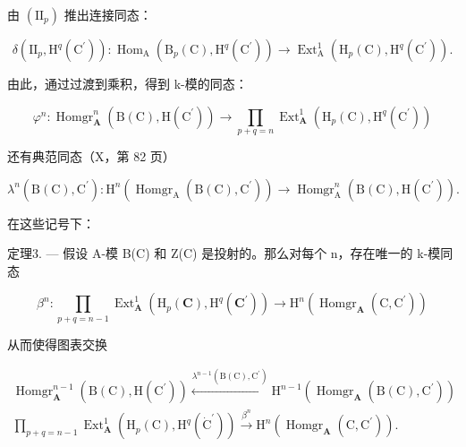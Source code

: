 由 \((\mathrm{II}_{p})\) 推出连接同态：

\[
\delta \left(\mathrm{II} _ {p}, \mathrm{H} ^ {q} \left(\mathrm{C} ^ {\prime}\right)\right): \operatorname{Hom} _ {\mathrm{A}} \left(\mathrm{B} _ {p} (\mathrm{C}), \mathrm{H} ^ {q} \left(\mathrm{C} ^ {\prime}\right)\right)\rightarrow \operatorname{Ext} _ {\mathrm{A}} ^ {1} \left(\mathrm{H} _ {p} (\mathrm{C}), \mathrm{H} ^ {q} \left(\mathrm{C} ^ {\prime}\right)\right).
\]

由此，通过过渡到乘积，得到 k-模的同态：

\[
\varphi^ {n}: \operatorname{Homgr} _ {\mathbf {A}} ^ {n} (\mathrm{B} (\mathrm{C}), \mathrm{H} (\mathrm{C} ^ {\prime})) \rightarrow \prod_ {p + q = n} \operatorname{Ext} _ {\mathbf {A}} ^ {1} \left(\mathrm{H} _ {p} (\mathrm{C}), \mathrm{H} ^ {q} (\mathrm{C} ^ {\prime})\right)
\]

还有典范同态（X，第 82 页）

\[
\lambda^ {n} (\mathrm{B} (\mathrm{C}), \mathrm{C} ^ {\prime}): \mathrm{H} ^ {n} \left(\operatorname{Homgr} _ {\mathrm{A}} (\mathrm{B} (\mathrm{C}), \mathrm{C} ^ {\prime})\right)\rightarrow \operatorname{Homgr} _ {\mathrm{A}} ^ {n} (\mathrm{B} (\mathrm{C}), \mathrm{H} (\mathrm{C} ^ {\prime})) .
\]

在这些记号下：

定理3. --- 假设 A-模 B(C) 和 Z(C) 是投射的。那么对每个 n，存在唯一的 k-模同态

\[
\beta^ {n}: \prod_ {p + q = n - 1} \operatorname{Ext} _ {\mathbf {A}} ^ {1} \left(\mathrm{H} _ {p} (\mathbf {C}), \mathrm{H} ^ {q} \left(\mathbf {C} ^ {\prime}\right)\right)\rightarrow \mathrm{H} ^ {n} \left(\operatorname{Homgr} _ {\mathbf {A}} \left(\mathrm{C}, \mathrm{C} ^ {\prime}\right)\right)
\]

从而使得图表交换

\[
\begin{array}{c} \operatorname{Homgr} _ {\mathbf {A}} ^ {n - 1} (\mathrm{B} (\mathrm{C}), \mathrm{H} (\mathrm{C} ^ {\prime})) \xleftarrow {\lambda^ {n - 1} (\mathrm{B} (\mathrm{C}) , \mathrm{C} ^ {\prime})} \mathrm{H} ^ {n - 1} (\operatorname{Homgr} _ {\mathbf {A}} (\mathrm{B} (\mathrm{C}), \mathrm{C} ^ {\prime})) \\ \prod_ {p + q = n - 1} \operatorname{Ext} _ {\mathbf {A}} ^ {1} (\mathrm{H} _ {p} (\mathrm{C}), \mathrm{H} ^ {q} (\dot {\mathrm{C}} ^ {\prime})) \xrightarrow {\beta^ {n}} \mathrm{H} ^ {n} (\operatorname{Homgr} _ {\mathbf {A}} (\mathrm{C}, \mathrm{C} ^ {\prime})). \end{array}
\]

